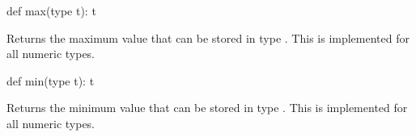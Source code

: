 \begin{protohead}
def max(type t): t
\end{protohead}
\begin{protobody}
Returns the maximum value that can be stored in type .  This
is implemented for all numeric types.
\end{protobody}

\begin{protohead}
def min(type t): t
\end{protohead}
\begin{protobody}
Returns the minimum value that can be stored in type .  This
is implemented for all numeric types.
\end{protobody}

